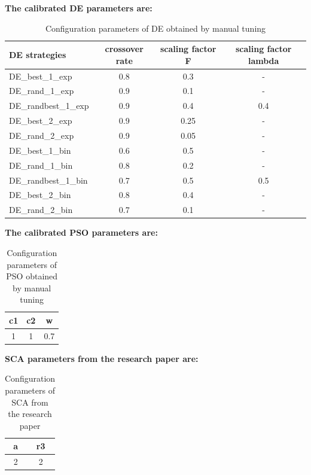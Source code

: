 \documentclass[12pt]{article}
\begin{document}
\textbf{The calibrated DE parameters are:}

\begin{table}[H]    
\centering
\small 
\begin{tabular}{lccc}

\hline
DE strategies & crossover rate& scaling factor F& scaling factor lambda\\
\hline 
DE\_best\_1\_exp & 0.8 &    0.3&    - \\
DE\_rand\_1\_exp& 0.9&    0.1&    - \\
DE\_randbest\_1\_exp& 0.9&    0.4&    0.4 \\
DE\_best\_2\_exp& 0.9&    0.25&    - \\
DE\_rand\_2\_exp& 0.9&    0.05&    - \\
DE\_best\_1\_bin& 0.6&    0.5&    - \\
DE\_rand\_1\_bin& 0.8&    0.2&    - \\
DE\_randbest\_1\_bin& 0.7&    0.5&    0.5\\
DE\_best\_2\_bin& 0.8&    0.4&    - \\
DE\_rand\_2\_bin& 0.7&    0.1&    - \\
\hline 
\end{tabular} 
\caption{Configuration parameters of DE obtained by manual tuning} 
\end{table}

\textbf{The calibrated PSO parameters are:}
\begin{table}[H]    
\centering
\footnotesize
\begin{tabular}{ccc}

\hline
c1&    c2&    w \\
\hline

1&    1&    0.7\\

\hline 
\end{tabular} 

\caption{Configuration parameters of PSO obtained by manual tuning} 
\end{table}


\textbf{SCA parameters from the research paper are:}
\begin{table}[H]    
\centering
\footnotesize
\begin{tabular}{cc}

\hline
a&    r3 \\
\hline

2&    2 \\

\hline 
\end{tabular} 

\caption{Configuration parameters of SCA from the research paper} 
\end{table}
\end{document}
